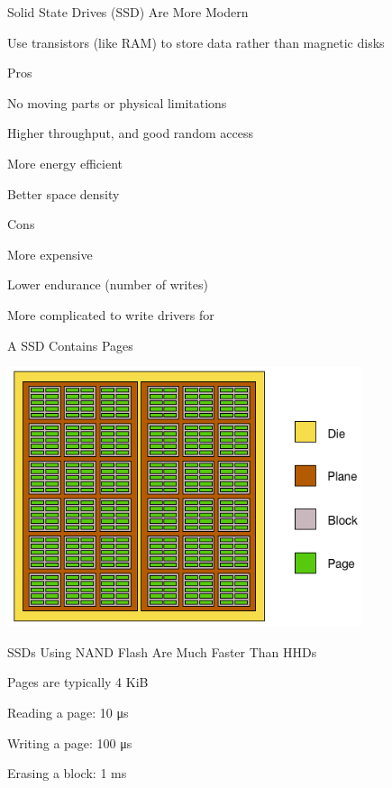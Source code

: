   \begin{frame}{Solid State Drives (SSD) Are More Modern}

    Use transistors (like RAM) to store data rather than magnetic disks

    \vspace{2em}

    Pros

    \hspace{2em} No moving parts or physical limitations

    \hspace{2em} Higher throughput, and good random access

    \hspace{2em} More energy efficient

    \hspace{2em} Better space density

    \vspace{2em}

    Cons

    \hspace{2em} More expensive

    \hspace{2em} Lower endurance (number of writes)

    \hspace{2em} More complicated to write drivers for
  \end{frame}

  \begin{frame}{A SSD Contains Pages}
    \begin{center}
      \includegraphics[height=0.8\textheight]{ssd.png}    
    \end{center}
  \end{frame}

  \begin{frame}{SSDs Using NAND Flash Are Much Faster Than HHDs}

    Pages are typically 4 KiB


    \vspace{2em}

    Reading a page: 10 μs

    Writing a page: 100 μs

    Erasing a block: 1 ms
  \end{frame}

